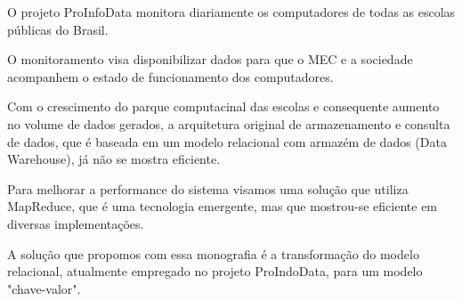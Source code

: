 

O projeto ProInfoData monitora diariamente os computadores de todas as escolas públicas do Brasil. 

O monitoramento visa disponibilizar dados para que o MEC e a sociedade acompanhem o estado
de funcionamento dos computadores. 

Com o crescimento do parque computacinal das escolas e consequente aumento no volume de dados gerados,
a arquitetura original de armazenamento e consulta de dados, que é baseada em um modelo 
relacional com armazém de dados (Data Warehouse), já não se mostra eficiente.

Para melhorar a performance do sistema visamos uma solução que utiliza MapReduce, que é uma tecnologia emergente,
mas que mostrou-se eficiente em diversas implementações.

A solução que propomos com essa monografia é a transformação do modelo relacional,
atualmente empregado no projeto ProIndoData, para um modelo "chave-valor".